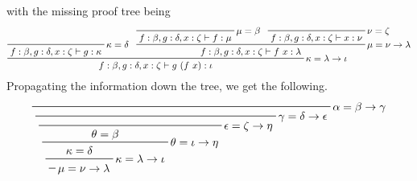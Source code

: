 \documentclass{article}
\begin{document}
\begin{enumerate}
\begin{enumerate}
        with the missing proof tree being
        \begin{displaymath}
          \prftree[r]{$\kappa = \lambda \to \iota$}{
            \prftree[r]{$\kappa = \delta$}{
              f : \beta, g : \delta, x : \zeta \vdash g : \kappa
            }
          }{
            \prftree[r]{$\mu = \nu \to \lambda$}{
              \prftree[r]{$\mu = \beta$}{
                f : \beta, g : \delta, x : \zeta \vdash f : \mu
              }
            }{
              \prftree[r]{$\nu = \zeta$}{
                f : \beta, g : \delta, x : \zeta \vdash x : \nu
              }
            }{
              f : \beta, g : \delta, x : \zeta \vdash f~x : \lambda
            }
          }{
            f : \beta, g : \delta, x : \zeta \vdash g~(f~x) : \iota
          }
        \end{displaymath}
        Propagating the information down the tree, we get the following.
        \begin{displaymath}
          \prfinterspace=1.5em
          \prftree[r]{$\alpha = \beta \to \gamma$}{
            \prftree[r]{$\gamma = \delta \to \epsilon$}{
              \prftree[r]{$\epsilon = \zeta \to \eta$}{
                \prftree[r]{$\theta = \iota \to \eta$}{
                  \theta = \beta
                }{
                  \prftree[r]{$\kappa = \lambda \to \iota$}{
                    \kappa = \delta
                  }{
                    \prftree[r]{$\mu = \nu \to \lambda$}{
}}}}}}
\end{displaymath}
\end{enumerate}
\end{enumerate}
\end{document}

